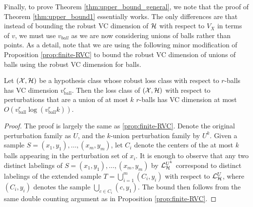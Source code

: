 Finally, to prove Theorem \ref{thm:upper_bound_general}, we note that the proof of Theorem \ref{thm:upper_bound1} essentially works. The only differences are that instead of bounding the robust VC dimension of $\mathcal H$ with respect to $V_X$ in terms of $v$, we must use $v_{ball}$ as we are now considering unions of balls rather than points. As a detail, note that we are using the following minor modification of Proposition \ref{prop:finite-RVC} to bound the robust VC dimension of unions of balls using the robust VC dimension for balls. 
\begin{prop}
Let $(\mathcal X,\mathcal H)$ be a hypothesis class whose robust loss class with respect to $r$-balls has VC dimension $v_{\text{ball}}^r$. Then the loss class of $(\mathcal X,\mathcal H)$ with respect to perturbations that are a union of at most $k$ $r$-balls has VC dimension at most $O(v_{\text{ball}}^r\log(v_{\text{ball}}^rk))$.
\end{prop}
\begin{proof}
The proof is largely the same as \ref{prop:finite-RVC}. Denote the original perturbation family as $U$, and the $k$-union perturbation family by $U^k$. Given a sample $S=(x_1,y_1),\ldots,(x_m,y_m)$, let $C_i$ denote the centers of the at most $k$ balls appearing in the perturbation set of $x_i$. It is enough to observe that any two distinct labelings of $S=(x_1,y_1),\ldots,(x_m,y_m)$ by $\mathcal{L}^{U^k}_{\mathcal H}$ correspond to distinct labelings of the extended sample $T=\bigcup_{i=1}^m (C_i,y_i)$ with respect to $\mathcal{L}^{U}_{\mathcal H}$, where $(C_i,y_i)$ denotes the sample $\bigcup_{c \in C_i} (c,y_1)$. The bound then follows from the same double counting argument as in Proposition \ref{prop:finite-RVC}.
\end{proof}












 